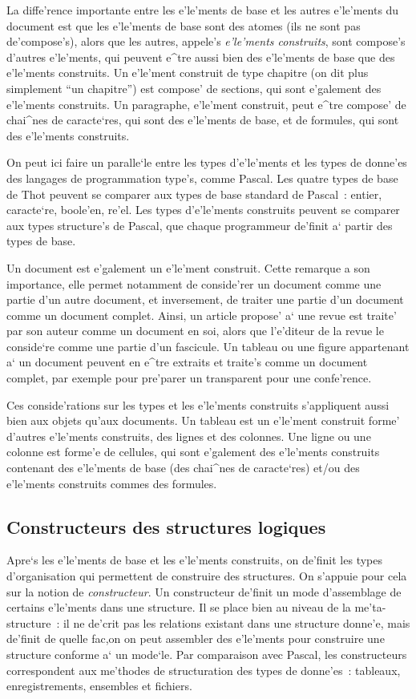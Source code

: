 La diffe'rence importante entre les e'le'ments de base et les autres
e'le'ments du document est que les e'le'ments de base sont des atomes
(ils ne sont pas de'compose's), alors que les autres, appele's
{\em e'le'ments construits}, sont compose's d'autres e'le'ments,
qui peuvent e^tre aussi bien des e'le'ments de base que des
e'le'ments construits. Un e'le'ment construit de type chapitre (on dit plus
simplement ``un chapitre'') est compose' de sections, qui sont e'galement des
e'le'ments construits. Un paragraphe, e'le'ment construit, peut e^tre compose'
de chai^nes de caracte`res, qui sont des e'le'ments de base, et de formules,
qui sont des e'le'ments construits.

On peut ici faire un paralle`le entre les types d'e'le'ments et les types de
donne'es des langages de programmation type's, comme Pascal. Les quatre types
de base de Thot peuvent se comparer aux types de base standard de Pascal~:
entier, caracte`re, boole'en, re'el. Les types d'e'le'ments construits
peuvent se comparer aux types structure's de Pascal, que chaque programmeur
de'finit a` partir des types de base.

Un document est e'galement un e'le'ment construit. Cette remarque a son
importance, elle permet notamment de conside'rer un document comme une
partie d'un autre document, et inversement, de traiter une partie
d'un document comme un document complet. Ainsi, un article propose' a`
une revue est traite' par son auteur comme un document en soi,
alors que l'e'diteur de la revue le conside`re comme une partie d'un
fascicule. Un tableau ou une figure appartenant a` un document peuvent
en e^tre extraits et traite's comme un document complet, par exemple
pour pre'parer un transparent pour une confe'rence.

Ces conside'rations sur les types et les e'le'ments construits s'appliquent
aussi bien aux objets qu'aux documents. Un tableau est un e'le'ment construit
forme' d'autres e'le'ments construits, des lignes et des colonnes. Une
ligne ou une colonne est forme'e de cellules, qui sont e'galement des
e'le'ments construits contenant des e'le'ments de base (des chai^nes de
caracte`res) et/ou des e'le'ments construits commes des formules.

\subsection{Constructeurs des structures logiques}

Apre`s les e'le'ments de base et les e'le'ments construits, on de'finit
les types d'orga\-ni\-sa\-tion qui permettent de construire des structures.
On s'appuie pour cela sur la notion de {\em constructeur}.
Un constructeur de'finit un mode d'assemblage de certains e'le'ments dans
une structure. Il se place bien au niveau de la me'ta-structure~:
il ne de'crit pas les relations existant dans une structure donne'e, mais
de'finit de quelle fac,on on peut assembler des e'le'ments pour construire
une structure conforme a` un mode`le.
Par comparaison avec Pascal, les constructeurs correspondent aux me'thodes
de structuration des types de donne'es~: tableaux, enregistrements, ensembles
et fichiers.

